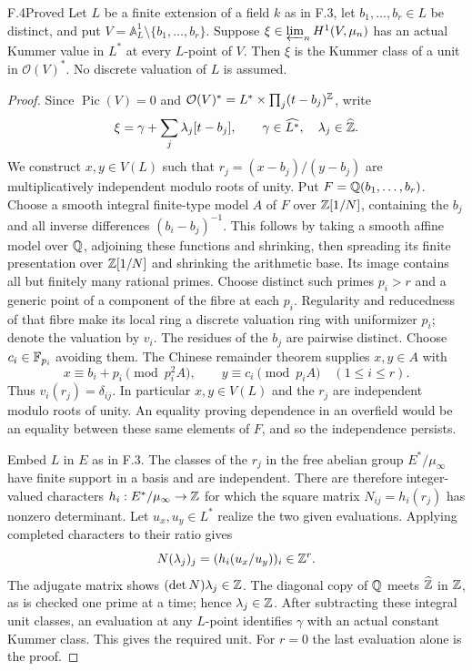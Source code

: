 \begin{claim}{F.4}{Proved}
Let $L$ be a finite extension of a field $k$ as in F.3, let
$b_1,\ldots,b_r\in L$ be distinct, and put
$V=\mathbb A^1_L\setminus\{b_1,\ldots,b_r\}$. Suppose
$\xi\in\varprojlim_n H^1(V,\mu_n)$ has an actual Kummer value in
$L^*$ at every $L$-point of $V$. Then $\xi$ is the Kummer class of
a unit in $\mathcal O(V)^*$. No discrete valuation of $L$ is assumed.
\end{claim}
\begin{proof}
Since $\operatorname{Pic}(V)=0$ and
$\mathcal O(V)^*=L^*\times\prod_j(t-b_j)^\mathbb Z$, write
\[
 \xi=\gamma+\sum_j\lambda_j[t-b_j],\qquad
 \gamma\in\widehat{L^*},\quad\lambda_j\in\widehat{\mathbb Z}.
\]
We construct $x,y\in V(L)$ such that
$r_j=(x-b_j)/(y-b_j)$ are multiplicatively independent modulo roots
of unity. Put $F=\mathbb Q(b_1,\ldots,b_r)$. Choose a smooth integral
finite-type model $A$ of $F$ over $\mathbb Z[1/N]$, containing the $b_j$
and all inverse differences $(b_i-b_j)^{-1}$. This follows by taking
a smooth affine model over $\mathbb Q$, adjoining these functions and
shrinking, then spreading its finite presentation over
$\mathbb Z[1/N]$ and shrinking the arithmetic base. Its image contains
all but finitely many rational primes. Choose distinct such primes
$p_i>r$ and a generic point of a component of the fibre at each
$p_i$. Regularity and reducedness of that fibre make its local ring
a discrete valuation ring with uniformizer $p_i$; denote the
valuation by $v_i$. The residues of the $b_j$ are pairwise distinct.
Choose $c_i\in\mathbb F_{p_i}$ avoiding them. The Chinese remainder
theorem supplies $x,y\in A$ with
\[
x\equiv b_i+p_i\pmod{p_i^2 A},\qquad
y\equiv c_i\pmod{p_i A}\quad(1\le i\le r).
\]
Thus $v_i(r_j)=\delta_{ij}$. In particular $x,y\in V(L)$ and the
$r_j$ are independent modulo roots of unity. An equality proving
dependence in an overfield would be an equality between these same
elements of $F$, and so the independence persists.

Embed $L$ in $E$ as in F.3. The classes of the $r_j$ in the free
abelian group $E^*/\mu_\infty$ have finite support in a basis and
are independent. There are therefore integer-valued characters
$h_i:E^*/\mu_\infty\to\mathbb Z$ for which the square matrix
$N_{ij}=h_i(r_j)$ has nonzero determinant. Let $u_x,u_y\in L^*$
realize the two given evaluations. Applying completed characters
to their ratio gives
\[
 N(\lambda_j)_j=(h_i(u_x/u_y))_i\in\mathbb Z^r.
\]
The adjugate matrix shows $(\det N)\lambda_j\in\mathbb Z$.
The diagonal copy of $\mathbb Q$ meets $\widehat{\mathbb Z}$ in $\mathbb Z$, as is
checked one prime at a time; hence $\lambda_j\in\mathbb Z$. After
subtracting these integral unit classes, an evaluation at any
$L$-point identifies $\gamma$ with an actual constant Kummer class.
This gives the required unit. For $r=0$ the last evaluation alone
is the proof.
\end{proof}

